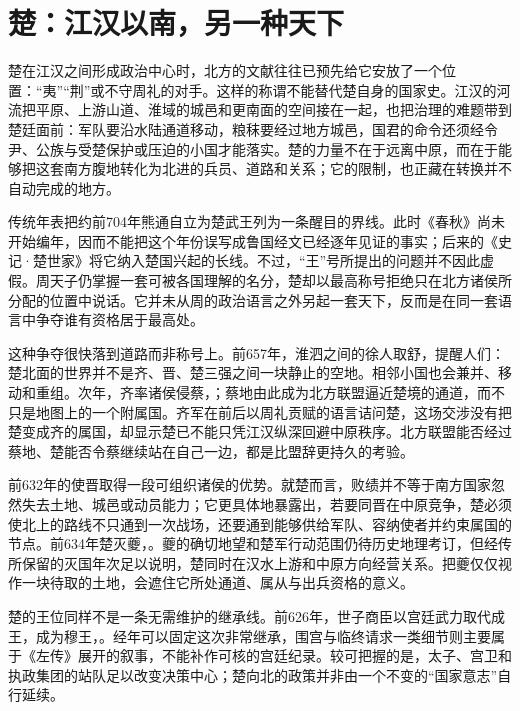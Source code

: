 \section{楚：江汉以南，另一种天下}

楚在江汉之间形成政治中心时，北方的文献往往已预先给它安放了一个位置：“夷”“荆”或不守周礼的对手。这样的称谓不能替代楚自身的国家史。江汉的河流把平原、上游山道、淮域的城邑和更南面的空间接在一起，也把治理的难题带到楚廷面前：军队要沿水陆通道移动，粮秣要经过地方城邑，国君的命令还须经令尹、公族与受楚保护或压迫的小国才能落实。楚的力量不在于远离中原，而在于能够把这套南方腹地转化为北进的兵员、道路和关系；它的限制，也正藏在转换并不自动完成的地方。


传统年表把约前704年熊通自立为楚武王列为一条醒目的界线。此时《春秋》尚未开始编年，因而不能把这个年份误写成鲁国经文已经逐年见证的事实；后来的《史记·楚世家》将它纳入楚国兴起的长线。不过，“王”号所提出的问题并不因此虚假。周天子仍掌握一套可被各国理解的名分，楚却以最高称号拒绝只在北方诸侯所分配的位置中说话。它并未从周的政治语言之外另起一套天下，反而是在同一套语言中争夺谁有资格居于最高处。

这种争夺很快落到道路而非称号上。前657年，淮泗之间的徐人取舒，提醒人们：楚北面的世界并不是齐、晋、楚三强之间一块静止的空地。相邻小国也会兼并、移动和重组。次年，齐率诸侯侵蔡，；蔡地由此成为北方联盟逼近楚境的通道，而不只是地图上的一个附属国。齐军在前后以周礼贡赋的语言诘问楚，这场交涉没有把楚变成齐的属国，却显示楚已不能只凭江汉纵深回避中原秩序。北方联盟能否经过蔡地、楚能否令蔡继续站在自己一边，都是比盟辞更持久的考验。

前632年的使晋取得一段可组织诸侯的优势。就楚而言，败绩并不等于南方国家忽然失去土地、城邑或动员能力；它更具体地暴露出，若要同晋在中原竞争，楚必须使北上的路线不只通到一次战场，还要通到能够供给军队、容纳使者并约束属国的节点。前634年楚灭夔，。夔的确切地望和楚军行动范围仍待历史地理考订，但经传所保留的灭国年次足以说明，楚同时在汉水上游和中原方向经营关系。把夔仅仅视作一块待取的土地，会遮住它所处通道、属从与出兵资格的意义。

楚的王位同样不是一条无需维护的继承线。前626年，世子商臣以宫廷武力取代成王，成为穆王，。经年可以固定这次非常继承，围宫与临终请求一类细节则主要属于《左传》展开的叙事，不能补作可核的宫廷纪录。较可把握的是，太子、宫卫和执政集团的站队足以改变决策中心；楚向北的政策并非由一个不变的“国家意志”自行延续。

